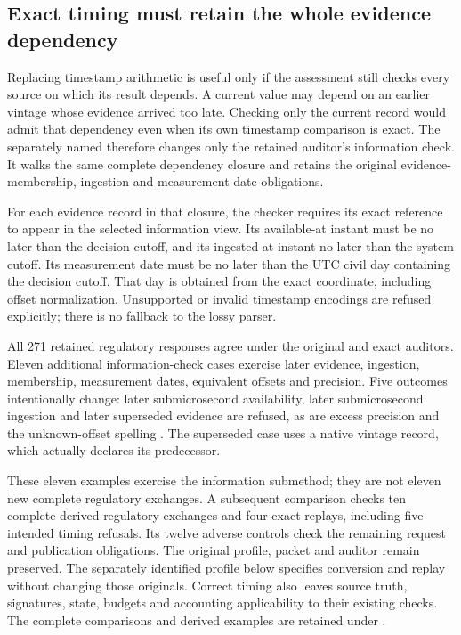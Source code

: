 \subsection{Exact timing must retain the whole evidence dependency}
\label{sec:exact-native-information}

Replacing timestamp arithmetic is useful only if the assessment still checks
every source on which its result depends. A current value may depend on an
earlier vintage whose evidence arrived too late. Checking only the current
record would admit that dependency even when its own timestamp comparison is
exact. The separately named  therefore changes
only the retained auditor's information check. It walks the same complete
dependency closure and retains the original evidence-membership, ingestion
and measurement-date obligations.

For each evidence record in that closure, the checker requires its exact
reference to appear in the selected information view. Its available-at instant
must be no later than the decision cutoff, and its ingested-at instant no later
than the system cutoff. Its measurement date must be no later than the UTC
civil day containing the decision cutoff. That day is obtained from the exact
coordinate, including offset normalization. Unsupported or invalid timestamp
encodings are refused explicitly; there is no fallback to the lossy parser.

All 271 retained regulatory responses agree under the original and exact
auditors. Eleven additional information-check cases exercise later evidence,
ingestion, membership, measurement dates, equivalent offsets and precision.
Five outcomes intentionally change: later submicrosecond availability, later
submicrosecond ingestion and later superseded evidence are refused, as are
excess precision and the unknown-offset spelling . The superseded
case uses a native vintage record, which actually declares its predecessor.

These eleven examples exercise the information submethod; they are not eleven
new complete regulatory exchanges. A subsequent comparison checks ten complete
derived regulatory exchanges and four exact replays, including five intended
timing refusals. Its twelve adverse controls check the remaining request and
publication obligations. The original profile, packet and auditor remain
preserved. The separately identified profile below specifies conversion and
replay without changing those originals. Correct timing also leaves source
truth, signatures, state, budgets and accounting applicability to their existing
checks. The complete comparisons and derived examples are retained under
.


